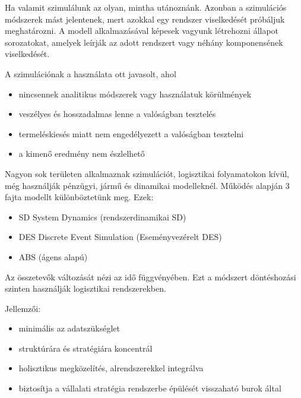 


\cite{szim}
\cite{szim2}

Ha valamit szimulálunk az olyan, mintha utánoznánk. Azonban a szimulációs módszerek mást jelentenek, mert azokkal egy rendszer viselkedését próbáljuk meghatározni. A modell alkalmazásával képesek vagyunk létrehozni állapot sorozatokat, amelyek leírják az adott rendszert vagy néhány komponensének viselkedését. 

A szimulációnak a használata ott javasolt, ahol

\begin{itemize}
	\item nincsennek analitikus módszerek vagy használatuk körülmények
	\item veszélyes és hosszadalmas lenne a valóságban tesztelés
	\item termeléskiesés miatt nem engedélyezett a valóságban tesztelni
	\item a kimenő eredmény nem észlelhető
\end{itemize}

Nagyon sok területen alkalmaznak szimulációt, logisztikai folyamatokon kívül, még használják pénzügyi, jármű és dinamikai modelleknél. 
Működés alapján 3 fajta modellt különböztetünk meg.
Ezek:

\begin{itemize}
	\item SD System Dynamics (rendszerdinamikai SD)
	\item  DES Discrete Event Simulation (Eseményvezérelt DES)
	\item  ABS (ágens alapú)
\end{itemize}


Az összetevők változását nézi az idő függvényében. Ezt a módszert döntéshozási szinten használják logisztikai rendszerekben. 

Jellemzői:

\begin{itemize}
	\item minimális az adatszükséglet
	\item  struktúrára és stratégiára koncentrál
	\item  holisztikus megközelítés, alrendszerekkel integrálva
	\item biztosítja a vállalati stratégia rendszerbe épülését visszaható burok által
\end{itemize}

